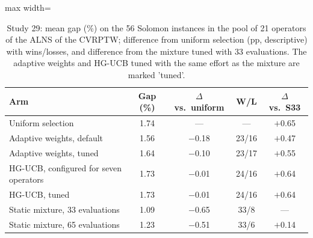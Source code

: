 \begin{table}[t]
\caption{Study 29: mean gap (\%) on the 56 Solomon instances in the pool of 21 operators of the ALNS of the CVRPTW; difference from uniform selection (pp, descriptive) with wins/losses, and difference from the mixture tuned with 33 evaluations. The adaptive weights and HG-UCB tuned with the same effort as the mixture are marked 'tuned'.}\label{tab:s29a}
\centering
\small
\begin{adjustbox}{max width=\linewidth}
\begin{tabular}{lcccc}
\toprule
Arm & Gap (\%) & $\Delta$ vs.\ uniform & W/L & $\Delta$ vs.\ S33 \\
\midrule
Uniform selection & 1.74 & --- & --- & $+$0.65 \\
Adaptive weights, default & 1.56 & $-$0.18 & 23/16 & $+$0.47 \\
Adaptive weights, tuned & 1.64 & $-$0.10 & 23/17 & $+$0.55 \\
HG-UCB, configured for seven operators & 1.73 & $-$0.01 & 24/16 & $+$0.64 \\
HG-UCB, tuned & 1.73 & $-$0.01 & 24/16 & $+$0.64 \\
Static mixture, 33 evaluations & 1.09 & $-$0.65 & 33/8 & --- \\
Static mixture, 65 evaluations & 1.23 & $-$0.51 & 33/6 & $+$0.14 \\
\bottomrule
\end{tabular}
\end{adjustbox}
\end{table}
